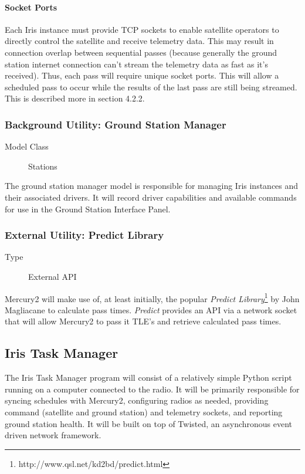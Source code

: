 \documentclass{mxl-note}
\begin{document}
\paragraph{Socket Ports}Each Iris instance must provide TCP sockets to enable satellite operators to directly control the satellite and receive telemetry data. This may result in connection overlap between sequential passes (because generally the ground station internet connection can't stream the telemetry data as fast as it's received). Thus, each pass will require unique socket ports. This will allow a scheduled pass to occur while the results of the last pass are still being streamed. This is described more in section 4.2.2.

\subsubsection{Background Utility: Ground Station Manager}
\begin{description}
	\item [Model Class]Stations
\end{description}
The ground station manager model is responsible for managing Iris instances and their associated drivers. It will record driver capabilities and available commands for use in the Ground Station Interface Panel.

\subsubsection{External Utility: Predict Library}
\begin{description}
	\item [Type]External API
\end{description} 
Mercury2 will make use of, at least initially, the popular \textit{Predict Library}\footnote{http://www.qsl.net/kd2bd/predict.html} by John Magliacane to calculate pass times. \textit{Predict} provides an API via a network socket that will allow Mercury2 to pass it TLE's and retrieve calculated pass times.

\subsection{Iris Task Manager}
The Iris Task Manager program will consist of a relatively simple Python script running on a computer connected to the radio. It will be primarily responsible for syncing schedules with Mercury2, configuring radios as needed, providing command (satellite and ground station) and telemetry sockets, and reporting ground station health. It will be built on top of Twisted, an asynchronous event driven network framework.
\end{document}
